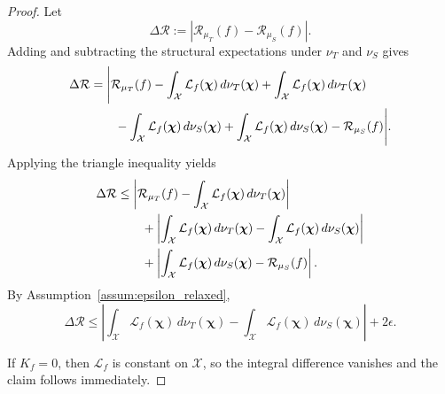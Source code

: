 \begin{proof}
Let
\begin{equation}
\Delta \mathcal{R}
:=
\left|
\mathcal{R}_{\mu_T}(f)-\mathcal{R}_{\mu_S}(f)
\right|.
\end{equation}
Adding and subtracting the structural expectations under $\nu_T$ and $\nu_S$ gives
\begin{align}
\Delta \mathcal{R}
&=
\Bigg|
\mathcal{R}_{\mu_T}(f)
-
\int_{\mathcal{X}}\mathcal{L}_f(\boldsymbol{\chi})\,d\nu_T(\boldsymbol{\chi})
+
\int_{\mathcal{X}}\mathcal{L}_f(\boldsymbol{\chi})\,d\nu_T(\boldsymbol{\chi})
\notag\\
&\qquad
-
\int_{\mathcal{X}}\mathcal{L}_f(\boldsymbol{\chi})\,d\nu_S(\boldsymbol{\chi})
+
\int_{\mathcal{X}}\mathcal{L}_f(\boldsymbol{\chi})\,d\nu_S(\boldsymbol{\chi})
-
\mathcal{R}_{\mu_S}(f)
\Bigg|.
\end{align}
Applying the triangle inequality yields
\begin{align}
\Delta \mathcal{R}
&\le
\left|
\mathcal{R}_{\mu_T}(f)
-
\int_{\mathcal{X}}\mathcal{L}_f(\boldsymbol{\chi})\,d\nu_T(\boldsymbol{\chi})
\right|
\notag\\
&\qquad+
\left|
\int_{\mathcal{X}}\mathcal{L}_f(\boldsymbol{\chi})\,d\nu_T(\boldsymbol{\chi})
-
\int_{\mathcal{X}}\mathcal{L}_f(\boldsymbol{\chi})\,d\nu_S(\boldsymbol{\chi})
\right|
\notag\\
&\qquad+
\left|
\int_{\mathcal{X}}\mathcal{L}_f(\boldsymbol{\chi})\,d\nu_S(\boldsymbol{\chi})
-
\mathcal{R}_{\mu_S}(f)
\right|.
\end{align}
By Assumption~\ref{assum:epsilon_relaxed},
\begin{equation}
\Delta \mathcal{R}
\le
\left|
\int_{\mathcal{X}}\mathcal{L}_f(\boldsymbol{\chi})\,d\nu_T(\boldsymbol{\chi})
-
\int_{\mathcal{X}}\mathcal{L}_f(\boldsymbol{\chi})\,d\nu_S(\boldsymbol{\chi})
\right|
+2\epsilon.
\end{equation}

If $K_f=0$, then $\mathcal{L}_f$ is constant on $\mathcal{X}$, so the integral difference vanishes and the claim follows immediately.


\end{proof}

